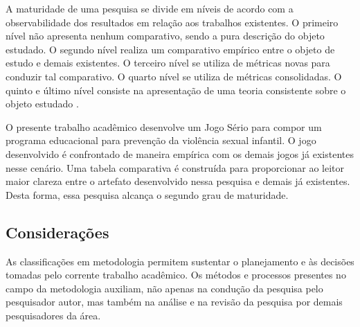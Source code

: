 \vspace{-0.2cm}

A maturidade de uma pesquisa se divide em níveis de acordo com a observabilidade dos resultados em relação aos trabalhos existentes. O primeiro nível não apresenta nenhum comparativo, sendo a pura descrição do objeto estudado. O segundo nível realiza um comparativo empírico entre o objeto de estudo e demais existentes. O terceiro nível se utiliza de métricas novas para conduzir tal comparativo. O quarto nível se utiliza de métricas consolidadas. O quinto e último nível consiste na apresentação de uma teoria consistente sobre o objeto estudado \cite{wazlawick2014metodologia}.%

O presente trabalho acadêmico desenvolve um Jogo Sério para compor um programa educacional para prevenção da violência sexual infantil. O jogo desenvolvido é confrontado de maneira empírica com os demais jogos já existentes nesse cenário. Uma tabela comparativa é construída para proporcionar ao leitor maior clareza entre o artefato desenvolvido nessa pesquisa e demais já existentes. Desta forma, essa pesquisa alcança o segundo grau de maturidade. 




\vspace{-0.13cm}


\subsection{Considerações}\label{sub:considerar}

\vspace{-0.2cm}

As classificações em metodologia permitem sustentar o planejamento e às decisões tomadas pelo corrente trabalho acadêmico. Os métodos e processos presentes no campo da metodologia auxiliam, não apenas na condução da pesquisa pelo pesquisador autor, mas também na análise e na revisão da pesquisa por demais pesquisadores da área.

